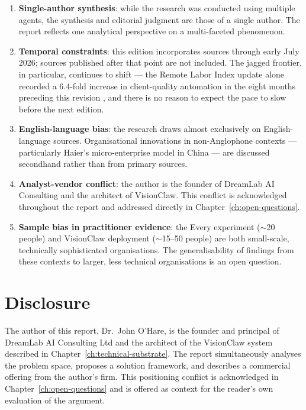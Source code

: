 \begin{enumerate}
  \item \textbf{Single-author synthesis}: while the research was conducted using multiple agents, the synthesis and editorial judgment are those of a single author. The report reflects one analytical perspective on a multi-faceted phenomenon.
  \item \textbf{Temporal constraints}: this edition incorporates sources through early July 2026; sources published after that point are not included. The jagged frontier, in particular, continues to shift --- the Remote Labor Index update alone recorded a 6.4-fold increase in client-quality automation in the eight months preceding this revision \parencite{CAIS2026RLI}, and there is no reason to expect the pace to slow before the next edition.
  \item \textbf{English-language bias}: the research draws almost exclusively on English-language sources. Organisational innovations in non-Anglophone contexts --- particularly Haier's micro-enterprise model in China --- are discussed secondhand rather than from primary sources.
  \item \textbf{Analyst-vendor conflict}: the author is the founder of DreamLab AI Consulting and the architect of VisionClaw. This conflict is acknowledged throughout the report and addressed directly in Chapter~\ref{ch:open-questions}.
  \item \textbf{Sample bias in practitioner evidence}: the Every experiment ($\sim$20 people) and VisionClaw deployment ($\sim$15--50 people) are both small-scale, technically sophisticated organisations. The generalisability of findings from these contexts to larger, less technical organisations is an open question.
\end{enumerate}

\section{Disclosure}

The author of this report, Dr.\ John O'Hare, is the founder and principal of DreamLab AI Consulting Ltd and the architect of the VisionClaw system described in Chapter~\ref{ch:technical-substrate}. The report simultaneously analyses the problem space, proposes a solution framework, and describes a commercial offering from the author's firm. This positioning conflict is acknowledged in Chapter~\ref{ch:open-questions} and is offered as context for the reader's own evaluation of the argument.
